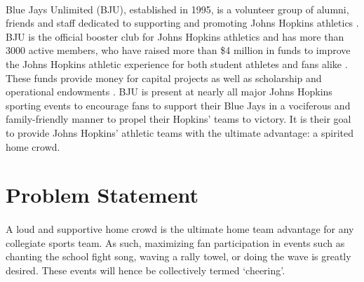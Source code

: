 \documentclass[12pt,letterpaper]{article}
\theoremstyle{definition}
\begin{document}
\paragraph{}
Blue Jays Unlimited (BJU), established in 1995, is a volunteer group of alumni, friends and staff dedicated to supporting and promoting Johns Hopkins athletics \cite{bjuwebsite}. BJU is the official booster club for Johns Hopkins athletics and has more than 3000 active members, who have raised more than \$4 million in funds to improve the Johns Hopkins athletic experience for both student athletes and fans alike \cite{bjuwebsite}. These funds provide money for capital projects as well as scholarship and operational endowments \cite{bjuwebsite}. BJU is present at nearly all major Johns Hopkins sporting events to encourage fans to support their Blue Jays in a vociferous and family-friendly manner to propel their Hopkins' teams to victory. It is their goal to provide Johns Hopkins' athletic teams with the ultimate advantage: a spirited home crowd. 


\section{Problem Statement}

\paragraph{}
A loud and supportive home crowd is the ultimate home team advantage for any collegiate sports team. As such, maximizing fan participation in events such as chanting the school fight song, waving a rally towel, or doing the wave is greatly desired. These events will hence be collectively termed `cheering'.
\end{document}
